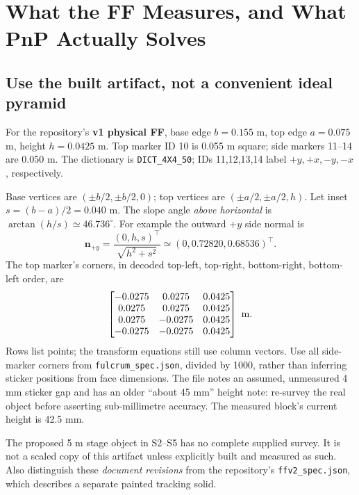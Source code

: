 \documentclass[11pt,a4paper]{article}
\begin{document}
\section{What the FF Measures, and What PnP Actually Solves}
\label{sec:pnp}

\subsection{Use the built artifact, not a convenient ideal pyramid}
For the repository's \textbf{v1 physical FF}, base edge $b=0.155$ m,
top edge $a=0.075$ m, height $h=0.0425$ m.
Top marker ID 10 is 0.055 m square; side markers 11--14 are 0.050 m.
The dictionary is \texttt{DICT\_4X4\_50}; IDs 11,12,13,14 label
$+y,+x,-y,-x$, respectively.

Base vertices are $(\pm b/2,\pm b/2,0)$; top vertices are
$(\pm a/2,\pm a/2,h)$. Let inset $s=(b-a)/2=0.040$ m.
The slope angle \emph{above horizontal} is $\arctan(h/s)\simeq46.736^\circ$.
For example the outward $+y$ side normal is
\begin{equation}
\bm{n}_{+y}=\frac{(0,h,s)^\top}{\sqrt{h^2+s^2}}
\simeq(0,0.72820,0.68536)^\top.
\end{equation}
The top marker's corners, in decoded top-left, top-right, bottom-right,
bottom-left order, are
\begin{equation}
\begin{bmatrix}
-0.0275& 0.0275&0.0425\\
 0.0275& 0.0275&0.0425\\
 0.0275&-0.0275&0.0425\\
-0.0275&-0.0275&0.0425
\end{bmatrix}\ {\rm m}.
\end{equation}
Rows list points; the transform equations still use column vectors.
Use all side-marker corners from \texttt{fulcrum\_spec.json}, divided by
1000, rather than inferring sticker positions from face dimensions.
The file notes an assumed, unmeasured 4 mm sticker gap and has an older
``about 45 mm'' height note: re-survey the real object before asserting
sub-millimetre accuracy. The measured block's current height is 42.5 mm.

The proposed 5 m stage object in S2--S5 has no complete supplied survey.
It is not a scaled copy of this artifact unless explicitly built and measured
as such. Also distinguish these \emph{document revisions} from the repository's
\texttt{ffv2\_spec.json}, which describes a separate painted tracking solid.
\end{document}
